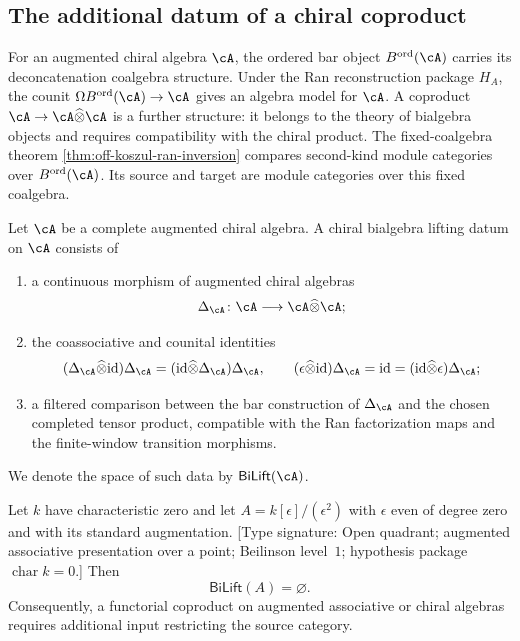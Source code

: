 \subsection{The additional datum of a chiral coproduct}
\label{subsec:coderived-chiral-coproduct}

For an augmented chiral algebra $\cA$, the ordered bar object
$B^{\mathrm{ord}}(\cA)$ carries its deconcatenation coalgebra
structure.  Under the Ran reconstruction package $H_A$, the counit
$\Omega B^{\mathrm{ord}}(\cA)\to\cA$ gives an algebra model for
$\cA$.  A coproduct
$\cA\to\cA\widehat\otimes\cA$ is a further structure: it belongs to
the theory of bialgebra objects and requires compatibility with the
chiral product.  The fixed-coalgebra theorem
\ref{thm:off-koszul-ran-inversion} compares second-kind module
categories over $B^{\mathrm{ord}}(\cA)$.  Its source and target are
module categories over this fixed coalgebra.

\begin{definition}
\label{def:chiral-bialgebra-lifting-datum}%
\label{conj:coderived-chiral-coproduct}%
Let $\cA$ be a complete augmented chiral algebra.  A chiral bialgebra
lifting datum on $\cA$ consists of
\begin{enumerate}[label=\textup{(\roman*)}]
\item a continuous morphism of augmented chiral algebras
\[
 \Delta_{\cA}\colon\cA\longrightarrow
 \cA\widehat\otimes\cA;
\]
\item the coassociative and counital identities
\[
 (\Delta_{\cA}\widehat\otimes\id)\Delta_{\cA}
 = (\id\widehat\otimes\Delta_{\cA})\Delta_{\cA},
 \qquad
 (\epsilon\widehat\otimes\id)\Delta_{\cA}
 =\id
 = (\id\widehat\otimes\epsilon)\Delta_{\cA};
\]
\item a filtered comparison between the bar construction of
$\Delta_{\cA}$ and the chosen completed tensor product, compatible
with the Ran factorization maps and the finite-window transition
morphisms.
\end{enumerate}
We denote the space of such data by $\mathsf{BiLift}(\cA)$.
\end{definition}

\begin{proposition}
\label{prop:dual-number-bialgebra-obstruction}
Let $k$ have characteristic zero and let
$A=k[\epsilon]/(\epsilon^2)$ with $\epsilon$ even of degree zero and
with its standard augmentation.
\textup{[Type signature: Open quadrant; augmented associative
presentation over a point; Beilinson level~$1$; hypothesis package
$\operatorname{char}k=0$.]}
Then
\[
 \mathsf{BiLift}(A)=\varnothing.
\]
Consequently, a functorial coproduct on augmented associative or
chiral algebras requires additional input restricting the source
category.
\end{proposition}

